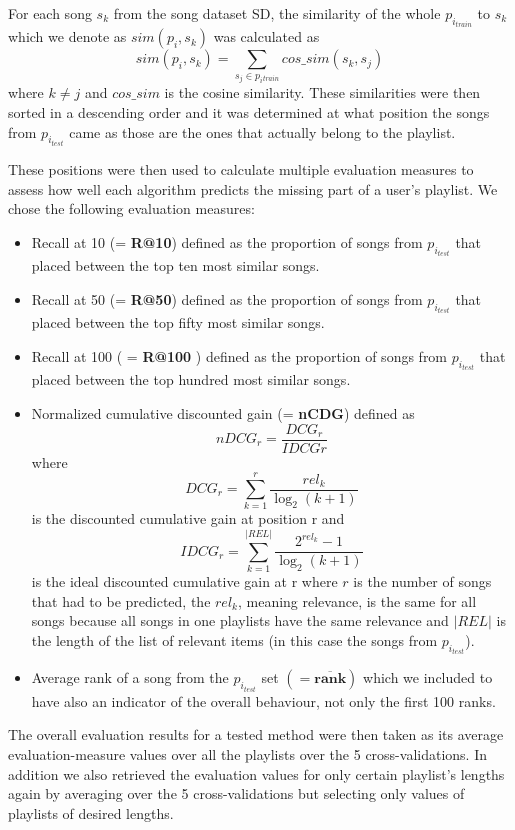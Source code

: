 For each song $ s_k $ from the song dataset SD, the similarity of the whole $p_{i_{train}}$ to $s_k$ which we denote as $ sim(p_i, s_k) $ was calculated as $$ sim(p_i, s_k) =\sum_{s_j\in{p_i{_{train}}}} cos\_sim(s_k, s_j) $$ where $ k \neq j$ and $cos\_sim$ is the cosine similarity. These similarities were then sorted in a descending order and it was determined at what position the songs from $p_{i_{test}} $ came as those are the ones that actually belong to the playlist. 

These positions were then used to calculate multiple evaluation measures to assess how well each algorithm predicts the missing part of a user's playlist. We chose the following evaluation measures:
\begin{itemize}
    \item Recall at 10 (= \textbf{R@10}) defined as the proportion of songs from $p_{i_{test}} $ that placed between the top ten most similar songs.
    \item Recall at 50 (= \textbf{R@50}) defined as the proportion of songs from $p_{i_{test}} $ that placed between the top fifty most similar songs.
    \item Recall at 100 ( = \textbf{R@100} ) defined as the proportion of songs from $p_{i_{test}} $ that placed between the top hundred most similar songs.
    \item Normalized cumulative discounted gain (= \textbf{nCDG}) defined as 
    $${nDCG_{r}} = \frac{DCG_{r}}{IDCG{r}} $$
    where 
    $${DCG_{r}} =\sum_{k=1}^{r}{\frac {rel_{k}}{\log _{2}(k+1)}} $$ 
    is the discounted cumulative gain at position r and 
    $$ {IDCG_{r}} =\sum _{k=1}^{|REL|}{\frac {2^{rel_{k}}-1}{\log _{2}(k+1)}} $$
    is the ideal discounted cumulative gain at r
    where $r$ is the number of songs that had to be predicted, the $rel_k$, meaning relevance, is the same for all songs because all songs in one playlists have the same relevance and $|REL|$ is the length of the list of relevant items (in this case the songs from $p_{i_{test}}$).
    \item Average rank of a song from the $p_{i_{test}}$ set $ \boldsymbol{ (= \overline{rank})} $ which we included to have also an indicator of the overall behaviour, not only the first 100 ranks.

\end{itemize}

The overall evaluation results for a tested method were then taken as its 
average evaluation-measure values over all the playlists over the 5 
cross-validations. In addition we also retrieved the evaluation values for only certain playlist's lengths again by averaging over the 5 cross-validations but selecting only values of playlists of desired lengths.

